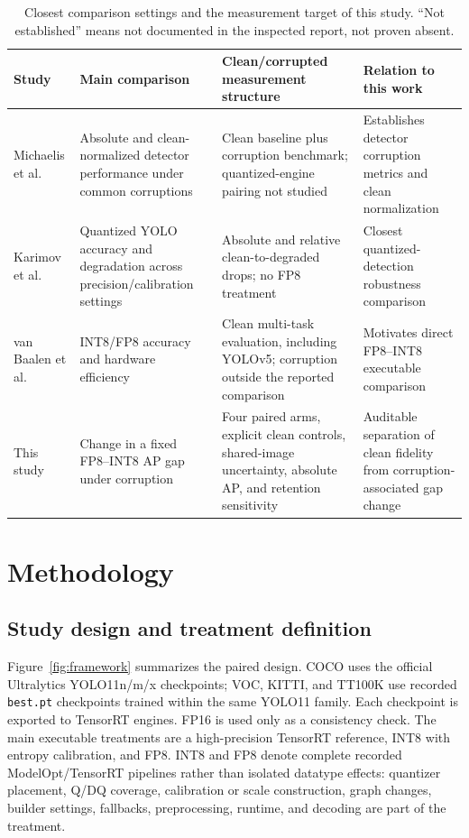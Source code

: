 \documentclass[a4paper,fleqn]{cas-dc}
\begin{document}
\begin{table}[t]
\centering\small
\caption{Closest comparison settings and the measurement target of this study. ``Not established'' means not documented in the inspected report, not proven absent.}
\label{tab:prior-art}
\setlength{\tabcolsep}{4pt}
\begin{tabular}{Y{2.3cm}Y{4.0cm}Y{4.0cm}Y{3.9cm}}
\toprule
Study & Main comparison & Clean/corrupted measurement structure & Relation to this work\\
\midrule
Michaelis et al.~\citep{michaelis2019detectorrobustness} & Absolute and clean-normalized detector performance under common corruptions & Clean baseline plus corruption benchmark; quantized-engine pairing not studied & Establishes detector corruption metrics and clean normalization\\
Karimov et al.~\citep{karimov2025robustness} & Quantized YOLO accuracy and degradation across precision/calibration settings & Absolute and relative clean-to-degraded drops; no FP8 treatment & Closest quantized-detection robustness comparison\\
van Baalen et al.~\citep{vanbaalen2023fp8int8} & INT8/FP8 accuracy and hardware efficiency & Clean multi-task evaluation, including YOLOv5; corruption outside the reported comparison & Motivates direct FP8--INT8 executable comparison\\
This study & Change in a fixed FP8--INT8 AP gap under corruption & Four paired arms, explicit clean controls, shared-image uncertainty, absolute AP, and retention sensitivity & Auditable separation of clean fidelity from corruption-associated gap change\\
\bottomrule
\end{tabular}
\end{table}

\section{Methodology}
\label{sec:methods}

\subsection{Study design and treatment definition}
\label{sec:study-design}

Figure~\ref{fig:framework} summarizes the paired design. COCO uses the official Ultralytics YOLO11n/m/x checkpoints; VOC, KITTI, and TT100K use recorded \texttt{best.pt} checkpoints trained within the same YOLO11 family. Each checkpoint is exported to TensorRT engines. FP16 is used only as a consistency check. The main executable treatments are a high-precision TensorRT reference, INT8 with entropy calibration, and FP8. INT8 and FP8 denote complete recorded ModelOpt/TensorRT pipelines rather than isolated datatype effects: quantizer placement, Q/DQ coverage, calibration or scale construction, graph changes, builder settings, fallbacks, preprocessing, runtime, and decoding are part of the treatment.
\end{document}
